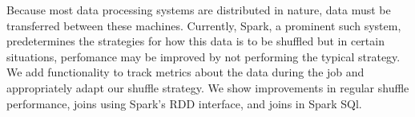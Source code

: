 % 
% 
%

Because most data processing systems are distributed in nature, data must be transferred
between these machines. Currently, Spark, a prominent such system, predetermines the strategies for how this data is to be shuffled
but in certain situations, perfomance may be improved by not performing the typical strategy.
We add functionality to track metrics about the data during the job and appropriately adapt our shuffle strategy.
We show improvements in regular shuffle performance, joins using Spark's RDD interface, and joins in Spark SQl.
